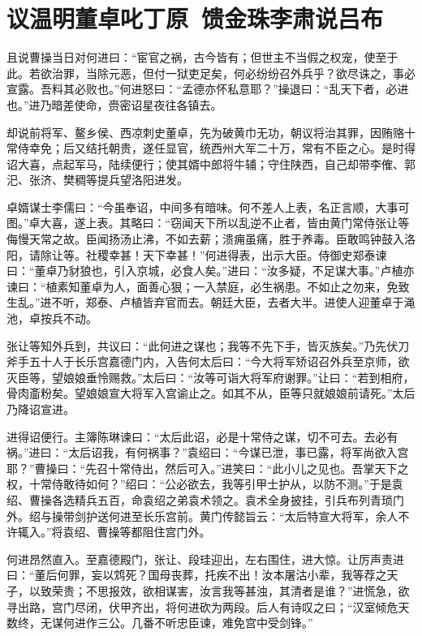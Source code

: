 \chapter{议温明董卓叱丁原~馈金珠李肃说吕布}

且说曹操当日对何进曰：“宦官之祸，古今皆有；但世主不当假之权宠，使至于此。若欲治罪，当除元恶，但付一狱吏足矣，何必纷纷召外兵乎？欲尽诛之，事必宣露。吾料其必败也。”何进怒曰：“孟德亦怀私意耶？”操退曰：“乱天下者，必进也。”进乃暗差使命，赍密诏星夜往各镇去。

却说前将军、鳌乡侯、西凉刺史董卓，先为破黄巾无功，朝议将治其罪，因贿赂十常侍幸免；后又结托朝贵，遂任显官，统西州大军二十万，常有不臣之心。是时得诏大喜，点起军马，陆续便行；使其婿中郎将牛辅；守住陕西，自己却带李傕、郭汜、张济、樊稠等提兵望洛阳进发。

卓婿谋士李儒曰：“今虽奉诏，中间多有暗味。何不差人上表，名正言顺，大事可图。”卓大喜，遂上表。其略曰：“窃闻天下所以乱逆不止者，皆由黄门常侍张让等侮慢天常之故。臣闻扬汤止沸，不如去薪；溃痈虽痛，胜于养毒。臣敢鸣钟鼓入洛阳，请除让等。社稷幸甚！天下幸甚！”何进得表，出示大臣。侍御史郑泰谏曰：“董卓乃豺狼也，引入京城，必食人矣。”进曰：“汝多疑，不足谋大事。”卢植亦谏曰：“植素知董卓为人，面善心狠；一入禁庭，必生祸患。不如止之勿来，免致生乱。”进不听，郑泰、卢植皆弃官而去。朝廷大臣，去者大半。进使人迎董卓于渑池，卓按兵不动。

张让等知外兵到，共议曰：“此何进之谋也；我等不先下手，皆灭族矣。”乃先伏刀斧手五十人于长乐宫嘉德门内，入告何太后曰：“今大将军矫诏召外兵至京师，欲灭臣等，望娘娘垂怜赐救。”太后曰：“汝等可诣大将军府谢罪。”让曰：“若到相府，骨肉齑粉矣。望娘娘宣大将军入宫谕止之。如其不从，臣等只就娘娘前请死。”太后乃降诏宣进。

进得诏便行。主簿陈琳谏曰：“太后此诏，必是十常侍之谋，切不可去。去必有祸。”进曰：“太后诏我，有何祸事？”袁绍曰：“今谋已泄，事已露，将军尚欲入宫耶？”曹操曰：“先召十常侍出，然后可入。”进笑曰：“此小儿之见也。吾掌天下之权，十常侍敢待如何？”绍曰：“公必欲去，我等引甲士护从，以防不测。”于是袁绍、曹操各选精兵五百，命袁绍之弟袁术领之。袁术全身披挂，引兵布列青琐门外。绍与操带剑护送何进至长乐宫前。黄门传懿旨云：“太后特宣大将军，余人不许辄入。”将袁绍、曹操等都阻住宫门外。

何进昂然直入。至嘉德殿门，张让、段珪迎出，左右围住，进大惊。让厉声责进曰：“董后何罪，妄以鸩死？国母丧葬，托疾不出！汝本屠沽小辈，我等荐之天子，以致荣贵；不思报效，欲相谋害，汝言我等甚浊，其清者是谁？”进慌急，欲寻出路，宫门尽闭，伏甲齐出，将何进砍为两段。后人有诗叹之曰；“汉室倾危天数终，无谋何进作三公。几番不听忠臣谏，难免宫中受剑锋。”

